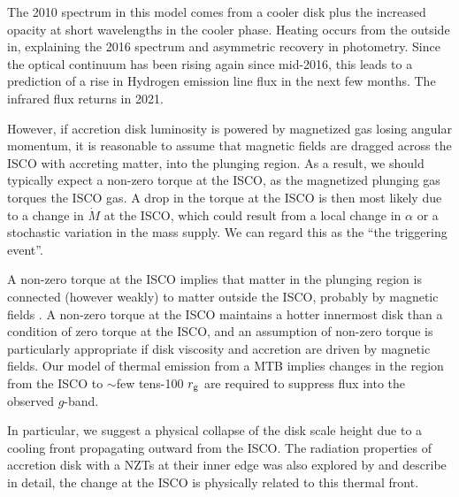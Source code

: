 \documentclass[a4paper,fleqn,usenatbib]{mnras}
\begin{document}
The 2010 spectrum in this model comes from a cooler disk plus the
increased opacity at short wavelengths in the cooler phase. Heating
occurs from the outside in, explaining the 2016 spectrum and
asymmetric recovery in photometry.  Since the
optical continuum has been rising again since mid-2016, this leads to
a prediction of a rise in Hydrogen emission line flux in the next few
months. The infrared flux returns in 2021. 


However, if accretion disk luminosity is powered by magnetized gas
losing angular momentum, it is reasonable to assume that magnetic
fields are dragged across the ISCO with accreting matter, into the
plunging region. As a result, we should typically expect a non-zero
torque at the ISCO, as the magnetized plunging gas torques the ISCO
gas. A drop in the torque at the ISCO is then most likely due to a
change in $\dot{M}$ at the ISCO, which could result from a local
change in $\alpha$ or a stochastic variation in the mass supply. We
can regard this as the ``the triggering event''.



A non-zero torque at the ISCO implies that matter in the
plunging region is connected (however weakly) to matter outside the
ISCO, probably by magnetic fields \citet[e.g., ][]{Gammie1999,
Agol_Krolik2000}. A non-zero torque at the ISCO maintains a hotter
innermost disk than a condition of zero torque at the ISCO, and an
assumption of non-zero torque is particularly appropriate if disk
viscosity and accretion are driven by magnetic fields. Our model of
thermal emission from a MTB implies changes in the region from the
ISCO to $\sim$few tens-100 $r_{\rm g}$ are required to suppress flux
into the observed $g$-band. 

In particular, we suggest a physical
collapse of the disk scale height due to a cooling front propagating
outward from the ISCO. The radiation properties of accretion disk with
a NZTs at their inner edge was also explored by \citet{Cao2003} and
\citet{Cannizzo1998b} describe in detail, the change at the ISCO is
physically related to this thermal front.
\end{document}
